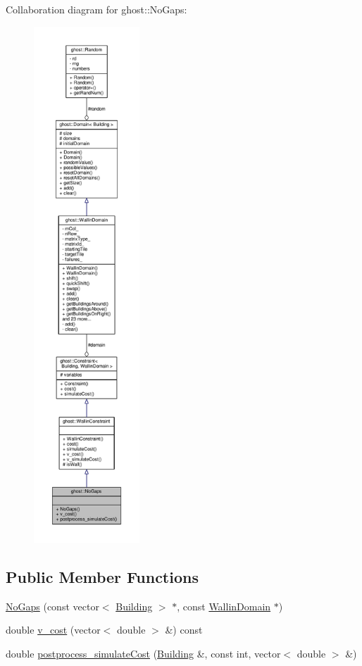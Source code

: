 Collaboration diagram for ghost\-:\-:No\-Gaps\-:\nopagebreak
\begin{figure}[H]
\begin{center}
\leavevmode
\includegraphics[height=550pt]{classghost_1_1NoGaps__coll__graph}
\end{center}
\end{figure}
\subsection*{Public Member Functions}
\begin{DoxyCompactItemize}
\item 
\hyperlink{classghost_1_1NoGaps_a3f3cbd41ad60c54f6030dd5203a25610}{No\-Gaps} (const vector$<$ \hyperlink{classghost_1_1Building}{Building} $>$ $\ast$, const \hyperlink{classghost_1_1WallinDomain}{Wallin\-Domain} $\ast$)
\item 
double \hyperlink{classghost_1_1NoGaps_a3fa23de6946e443f009ecb5054a96572}{v\-\_\-cost} (vector$<$ double $>$ \&) const 
\item 
double \hyperlink{classghost_1_1NoGaps_a65b1ce5aa567ad8c67b184cec8f320ac}{postprocess\-\_\-simulate\-Cost} (\hyperlink{classghost_1_1Building}{Building} \&, const int, vector$<$ double $>$ \&)
\end{DoxyCompactItemize}
